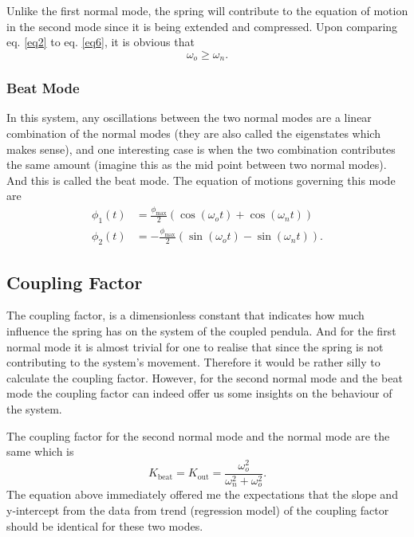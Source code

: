 \documentclass[aps,prl,reprint,10pt,amsmath,amssymb,superscriptaddress,a4paper]{revtex4-2}
\begin{document}
Unlike the first normal mode, the spring will contribute to the equation of motion in the second mode since it is being extended and compressed. Upon comparing eq. \ref{eq2} to eq. \ref{eq6}, it is obvious that 
$$\omega_o \ge \omega_n.$$

\subsubsection{Beat Mode}
In this system, any oscillations between the two normal modes are a linear combination of the normal modes (they are also called the eigenstates which makes sense), and one interesting case is when the two combination contributes the same amount (imagine this as the mid point between two normal modes). And this is called the beat mode. The equation of motions governing this mode are 
\begin{align}
    \phi_1(t) &= \frac{\phi_{\text{max}}}{2} (\cos(\omega_o t) + \cos(\omega_n t))\\
    \phi_2(t) &= -\frac{\phi_{\text{max}}}{2} (\sin(\omega_o t) - \sin(\omega_n t)).
\end{align}
\subsection{Coupling Factor}
The coupling factor, is a dimensionless constant that indicates how much influence the spring has on the system of the coupled pendula. And for the first normal mode it is almost trivial for one to realise that since the spring is not contributing to the system's movement. Therefore it would be rather silly to calculate the coupling factor. However, for the second normal mode and the beat mode the coupling factor can indeed offer us some insights on the behaviour of the system. 

The coupling factor for the second normal mode \cite{noauthor_coupled_nodate} and the normal mode are the same which is
\begin{equation}
    K_{\text{beat}} = K_{\text{out}} = \frac{\omega_o^2}{\omega_n^2+\omega_o^2}.
\end{equation}
The equation above immediately offered me the expectations that the slope and y-intercept from the data from trend (regression model) of the coupling factor should be identical for these two modes.
\end{document}
